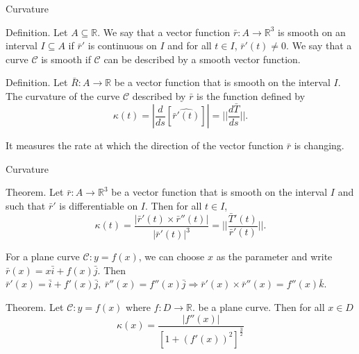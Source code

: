 \documentclass[aspectratio=169, UTF8]{ctexbeamer}
\begin{document}
       \begin{frame}[t]{Curvature}
        \begin{block}
            \par \textcolor{yy}{Definition.} Let $A \subseteq \mathbb{R}$. We say that a vector function $\bar{r}: A \to \mathbb{R}^3$ is \textcolor{yy}{smooth} on an interval $I \subseteq A$ if $\bar{r}'$ is continuous on $I$ and for all $t \in I$, $\bar{r}'(t) \neq 0$. We say that a curve $\mathcal{C}$ is \textcolor{yy}{smooth} if $\mathcal{C}$ can be described by a smooth vector function.
        \end{block}

        \begin{block}
            \par \textcolor{yy}{Definition.} Let $\bar{R}: A \to \mathbb{R}$ be a vector function that is smooth on the interval $I$. The \textcolor{yy}{curvature} of the curve $\mathcal{C}$ described by $\bar{r}$ is the function defined by 
            \begin{equation*}
                \kappa (t) = \left| \dfrac{d}{ds} \left[ \widehat{ \bar{r}'(t) } \right] \right| = ||\frac{d\bar{T}}{ds}||.
            \end{equation*}
            \par It measures the rate at which the direction of the vector function $\bar{r}$ is changing.
            \end{block}
    \end{frame}

    \begin{frame}[t]{Curvature}
        \begin{block}
            \par \textcolor{yy}{Theorem.} Let $\bar{r}: A \to \mathbb{R}^3$ be a vector function that is smooth on the interval $I$ and such that $\bar{r}'$ is differentiable on $I$. Then for all $t \in I$, 
            \begin{equation*}
                \kappa (t) = \dfrac{\left| \bar{r}'(t) \times \bar{r}''(t)\right|}{\left| \bar{r}'(t) \right|^3} = ||\frac{\bar{T}'(t)}{\bar{r}'(t)}||.
            \end{equation*}
        \end{block}
        \par For a plane curve $\mathcal{C}: y = f(x)$, we can choose $x$ as the parameter and write $\bar{r}(x) = x \bar{i} + f(x) \bar{j}$. Then $\bar{r}'(x) = \bar{i} + f'(x) \bar{j},\ \bar{r}''(x) = f''(x) \bar{j} \Rightarrow \bar{r}'(x) \times \bar{r}''(x) = f''(x) \bar{k}$.
        
        \begin{block}
            \par \textcolor{yy}{Theorem.} Let $\mathcal{C}: y = f(x)$ where $f: D \to \mathbb{R}$. be a plane curve. Then for all $x \in D$
            \begin{equation*}
                \kappa(x) = \dfrac{|f''(x)|}{\left[1 + \left(f'(x)\right)^2\right]^{\frac{3}{2}}}      
            \end{equation*}
        \end{block}
    \end{frame}
    
\end{document}

